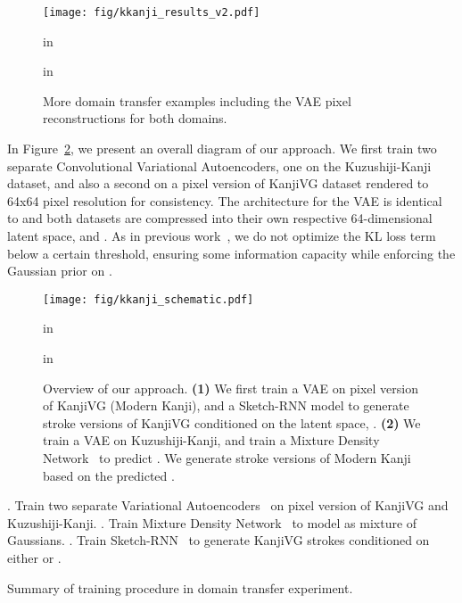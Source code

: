\documentclass{article}
\begin{document}
\begin{CJK}{UTF8}{min}
\begin{figure}[!htb]
\vskip -0.05in
\begin{center}
\centerline{\texttt{[image: fig/kkanji\_results\_v2.pdf]}}
 in
\caption{More domain transfer examples including the VAE pixel reconstructions for both domains.}
\label{fig:kkanji_results_v2}
\end{center}
 in
\end{figure}

In Figure~\ref{fig:kkanji_schematic}, we present an overall diagram of our approach. We first train two separate Convolutional Variational Autoencoders, one on the Kuzushiji-Kanji dataset, and also a second on a pixel version of KanjiVG dataset rendered to 64x64 pixel resolution for consistency. The architecture for the VAE is identical to \cite{ha2018recurrent} and both datasets are compressed into their own respective 64-dimensional latent space,  and . As in previous work~\cite{ha2017neural}, we do not optimize the KL loss term below a certain threshold, ensuring some information capacity while enforcing the Gaussian prior on .

\begin{figure}[!htb]
\vskip -0.00in
\begin{center}
\centerline{\texttt{[image: fig/kkanji\_schematic.pdf]}}
 in
\caption{Overview of our approach. \textbf{(1)} We first train a VAE on pixel version of KanjiVG (Modern Kanji), and a Sketch-RNN model to generate stroke versions of KanjiVG conditioned on the latent space, . \textbf{(2)} We train a VAE on Kuzushiji-Kanji, and train a Mixture Density Network~\cite{bishop_mdn} to predict . We generate stroke versions of Modern Kanji based on the predicted .}
\label{fig:kkanji_schematic}
\end{center}
 in
\end{figure}

\begin{algorithm}[!htb]
\begin{algorithmic}
\begin{small}
. Train two separate Variational Autoencoders~\cite{vae, vae_dm} on pixel version of KanjiVG and Kuzushiji-Kanji.
. Train Mixture Density Network~\cite{bishop_mdn} to model  as mixture of Gaussians.
. Train Sketch-RNN~\cite{ha2017neural} to generate KanjiVG strokes conditioned on either  or .
\end{small}
\end{algorithmic}
\caption{Summary of training procedure in domain transfer experiment.}
\label{kanji_transfer_training_procedure}
\vskip -0.00in
\end{algorithm}


\end{CJK}
\end{document}
